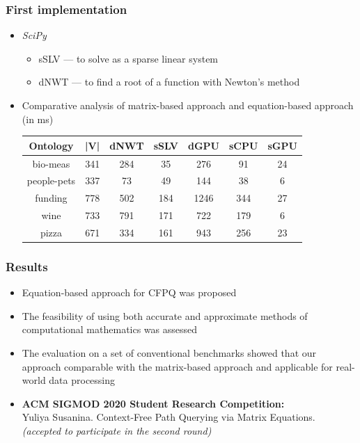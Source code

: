 \documentclass[xcolor=table]{beamer}
\begin{document}
\begin{frame}[fragile]
  \transwipe[direction=90]
  \frametitle{First implementation}

\begin{itemize}
    \item \textit{SciPy}
    \begin{itemize}
        \item sSLV --- to solve as a sparse linear system
        \item dNWT --- to find a root of a function with Newton's method
    \end{itemize}
    \item Comparative analysis of matrix-based approach and equation-based approach (in ms)

        \begin{table}[h]
        \centering
        \begin{tabular}{ | c | c || c | c || c | c | c |}
        \hline
        Ontology    & |V| & dNWT & sSLV & dGPU & sCPU &  sGPU \\
        \hline
        \hline
        bio-meas    & 341 &  284 & 35   & 276  & 91  & 24\\
        people-pets & 337 &  73  & 49   & 144  & 38  & 6\\
        funding     & 778 &  502 & 184  & 1246 & 344 & 27\\
        wine        & 733 &  791 & 171  & 722  & 179 & 6\\
        pizza       & 671 &  334 & 161  & 943  & 256 & 23\\
        \hline
        \end{tabular}
        
        \end{table}

\end{itemize}
\end{frame}



\begin{frame}[fragile]
  \transwipe[direction=90]
  \frametitle{Results}
  
\begin{itemize}

  \item Equation-based approach for CFPQ was proposed
  \item The feasibility of using both accurate and approximate methods of computational mathematics was assessed
  \item The evaluation on a set of conventional benchmarks showed that our approach
comparable with the matrix-based approach and applicable for real-world data processing
  \item \textbf{ACM SIGMOD 2020 Student Research Competition:} \\ 
  Yuliya Susanina. Context-Free Path Querying via Matrix Equations.\\
  \textit{(accepted to participate in the second round)}
  
\end{itemize}

\end{frame}
\end{document}
